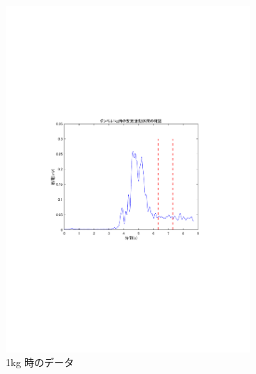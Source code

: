 \documentclass[dvipdfmx, titlepage, t]{jsarticle}
\begin{document}
\begin{figure}[H] %
    \centering %

    \begin{subfigure}[b]{0.32\linewidth} %
        \centering
        \includegraphics[trim=90 250 100 250 clip,width=\linewidth]{figure/check_1kg.pdf} %
        \caption{1kg 時のデータ} %
        \label{fig:cha}
    \end{subfigure}
    \hfill %
    \begin{subfigure}[b]{0.32\linewidth}
        \centering

\end{subfigure}
\end{figure}
\end{document}
